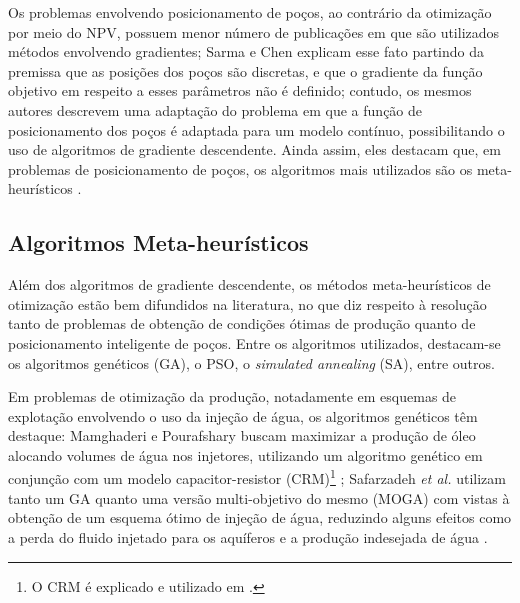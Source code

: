 Os problemas envolvendo posicionamento de po\c{c}os, ao contr\'{a}rio da otimiza\c{c}\~{a}o por meio do NPV, possuem menor n\'{u}mero de publica\c{c}\~{o}es em que s\~{a}o utilizados m\'{e}todos envolvendo gradientes; Sarma e Chen explicam esse fato partindo da premissa que as posi\c{c}\~{o}es dos po\c{c}os s\~{a}o discretas, e que o gradiente da fun\c{c}\~{a}o objetivo em respeito a esses par\^{a}metros n\~{a}o \'{e} definido; contudo, os mesmos autores descrevem uma adapta\c{c}\~{a}o do problema em que a fun\c{c}\~{a}o de posicionamento dos po\c{c}os \'{e} adaptada para um modelo cont\'{i}nuo, possibilitando o uso de algoritmos de gradiente descendente. Ainda assim, eles destacam que, em problemas de posicionamento de po\c{c}os, os algoritmos mais utilizados s\~{a}o os meta-heur\'{i}sticos \cite{sarmaChen}.


\subsection{Algoritmos Meta-heur\'{i}sticos}
Al\'{e}m dos algoritmos de gradiente descendente, os m\'{e}todos meta-heur\'{i}sticos de otimiza\c{c}\~{a}o est\~{a}o bem difundidos na literatura, no que diz respeito \`{a} resolu\c{c}\~{a}o tanto de problemas de obten\c{c}\~{a}o de condi\c{c}\~{o}es \'{o}timas de produ\c{c}\~{a}o quanto de posicionamento inteligente de po\c{c}os. Entre os algoritmos utilizados, destacam-se os algoritmos gen\'{e}ticos (GA), o PSO, o \textit{simulated annealing} (SA), entre outros.

Em problemas de otimiza\c{c}\~{a}o da produ\c{c}\~{a}o, notadamente em esquemas de explota\c{c}\~{a}o envolvendo o uso da inje\c{c}\~{a}o de \'{a}gua, os algoritmos gen\'{e}ticos t\^{e}m destaque: Mamghaderi e Pourafshary buscam maximizar a produ\c{c}\~{a}o de \'{o}leo alocando volumes de \'{a}gua nos injetores, utilizando um algoritmo gen\'{e}tico em conjun\c{c}\~{a}o com um modelo capacitor-resistor (CRM)\footnote{O CRM \'{e} explicado e utilizado em \cite{SAYARPOUR2009227}.} \cite{MAMGHADERI2013107}; Safarzadeh \textit{et al.} utilizam tanto um GA quanto uma vers\~{a}o multi-objetivo do mesmo (MOGA) com vistas \`{a} obten\c{c}\~{a}o de um esquema \'{o}timo de inje\c{c}\~{a}o de \'{a}gua, reduzindo alguns efeitos como a perda do fluido injetado para os aqu\'{i}feros e a produ\c{c}\~{a}o indesejada de \'{a}gua \cite{Safarzadeh2015}.

